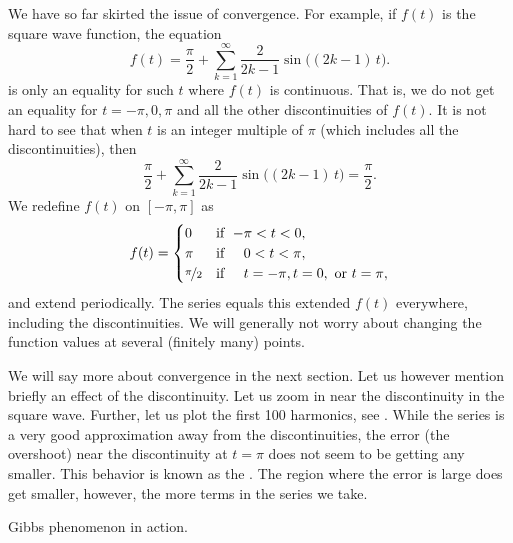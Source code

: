 We have so far skirted the issue of convergence.  For example,
if $f(t)$ is the square wave function,
the equation
\begin{equation*}
f(t) = 
\frac{\pi}{2} + \sum_{k=1}^\infty
\frac{2}{2k-1} 
\sin \bigl( (2k-1)\, t \bigr) .
\end{equation*}
is only an equality for such $t$ where $f(t)$ is continuous.  That is,
we do not get an equality for $t=-\pi,0,\pi$ and all the other discontinuities
of $f(t)$.  It is not hard to see that when $t$ is an integer multiple of
$\pi$ (which includes all the discontinuities), then
\begin{equation*}
\frac{\pi}{2} + \sum_{k=1}^\infty
\frac{2}{2k-1} 
\sin \bigl( (2k-1)\, t \bigr) = \frac{\pi}{2} .
\end{equation*}
We redefine $f(t)$ on $[-\pi,\pi]$ as
\begin{equation*}
f(t) =
\begin{cases}
0 & \text{if } \; {-\pi} < t < 0 , \\
\pi & \text{if } \; \phantom{-}0 < t < \pi , \\
\nicefrac{\pi}{2} & \text{if } \; \phantom{-}t = -\pi, 
t = 0,\text{ or }
t = \pi,
\end{cases}
\end{equation*}
and extend periodically.
The series equals this extended $f(t)$ everywhere, including the
discontinuities.
We will generally not worry about changing the function values
at several (finitely many) points.

We will say more about convergence in the next section.  Let us however
mention briefly an effect of the discontinuity.  Let us zoom in near the
discontinuity in the square wave.  Further, let us plot the first 100
harmonics, see
.  While the
series is a very good approximation away from the discontinuities, the error
(the overshoot)
near the discontinuity at $t=\pi$ does not seem to be getting any smaller.
This behavior is known as the \emph{}.
The region where the error is large does get smaller, however, the more
terms in the series we take.

\begin{myfig}
\capstart
{}
\caption{Gibbs phenomenon in action.\label{ts:squarewavegibbsfig}}
\end{myfig}


